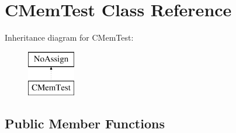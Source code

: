 \hypertarget{classCMemTest}{}\section{C\+Mem\+Test Class Reference}
\label{classCMemTest}
Inheritance diagram for C\+Mem\+Test\+:\begin{figure}[H]
\begin{center}
\leavevmode
\includegraphics[height=2.000000cm]{classCMemTest}
\end{center}
\end{figure}
\subsection*{Public Member Functions}
